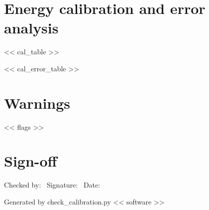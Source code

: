 \documentclass[11pt,a4paper]{article}
\begin{document}
\section{Energy calibration and error analysis}
<< cal_table >>

\vspace{0.3em}
<< cal_error_table >>

\section{Warnings}
<< flags >>

\section{Sign-off}
\vspace{0.3em}
\noindent Checked by:\ \underline{\hspace{4cm}}\hfill
Signature:\ \underline{\hspace{4cm}}\hfill
Date:\ \underline{\hspace{2.5cm}}

\vfill
{\footnotesize Generated by check\_calibration.py \quad << software >>}
\end{document}
